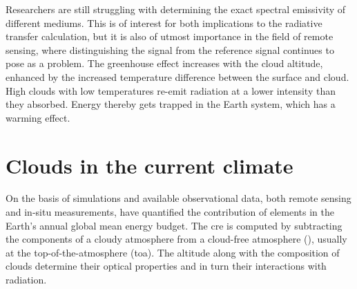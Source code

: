Researchers are still struggling with determining the exact spectral emissivity of different mediums. This is of interest for both implications to the radiative transfer calculation, but it is also of utmost importance in the field of remote sensing, where distinguishing the signal from the reference signal continues to pose as a problem.
The greenhouse effect increases with the cloud altitude, enhanced by the increased temperature difference between the surface and cloud. High clouds with low temperatures re-emit radiation at a lower intensity than they absorbed. Energy thereby gets trapped in the Earth system, which has a warming effect. 
\section{Clouds in the current climate} \label{sec:intro_cloud_current_climate}
On the basis of simulations and available observational data, both remote sensing and in-situ measurements,  have quantified the contribution of elements in the Earth's annual global mean energy budget. The \acrfull{cre} is computed by subtracting the components of a cloudy atmosphere from a cloud-free atmosphere (\cite{RAMANATHAN1989}), usually at the top-of-the-atmosphere (\acrshort{toa}). The altitude along with the composition of clouds determine their optical properties and in turn their interactions with radiation.

